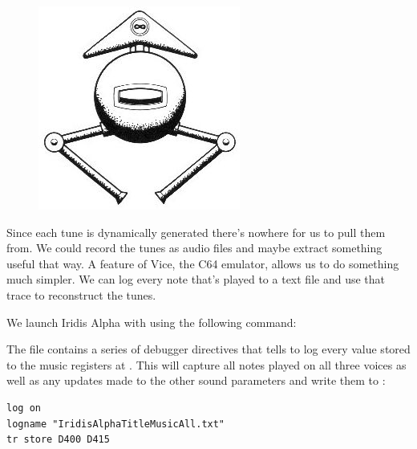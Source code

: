 \begin{definition}
\setlength{\intextsep}{0pt}%
\setlength{\columnsep}{3pt}%
\begin{figure}
\includegraphics[width=\linewidth]{src/callout/ia.jpg} 
\end{figure}
\small
Since each tune is dynamically generated there's nowhere for us to pull them from. We could record
the tunes as audio files and maybe extract something useful that way. A feature of Vice, the C64
emulator, allows us to do something much simpler. We can log every note that's played to a 
text file and use that trace to reconstruct the tunes.

We launch Iridis Alpha with  using the following command:


The  file contains a series of debugger directives that tells 
to log every value stored to the music registers at . This will capture
all notes played on all three voices as well as any updates made to the other sound parameters
and write them to :

\begin{lstlisting}
log on
logname "IridisAlphaTitleMusicAll.txt"
tr store D400 D415
\end{lstlisting}


\end{definition}
